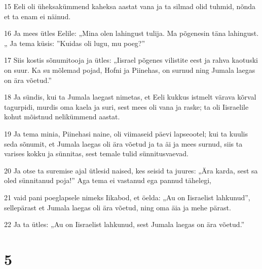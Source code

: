 \par 15 Eeli oli üheksakümmend kaheksa aastat vana ja ta silmad olid tuhmid, nõnda et ta enam ei näinud.
\par 16 Ja mees ütles Eelile: „Mina olen lahingust tulija. Ma põgenesin täna lahingust.„ Ja tema küsis: ”Kuidas oli lugu, mu poeg?”
\par 17 Siis kostis sõnumitooja ja ütles: „Iisrael põgenes vilistite eest ja rahva kaotuski on suur. Ka su mõlemad pojad, Hofni ja Piinehas, on surnud ning Jumala laegas on ära võetud.”
\par 18 Ja sündis, kui ta Jumala laegast nimetas, et Eeli kukkus istmelt värava kõrval tagurpidi, murdis oma kaela ja suri, sest mees oli vana ja raske; ta oli Iisraelile kohut mõistnud nelikümmend aastat.
\par 19 Ja tema minia, Piinehasi naine, oli viimaseid päevi lapseootel; kui ta kuulis seda sõnumit, et Jumala laegas oli ära võetud ja ta äi ja mees surnud, siis ta varises kokku ja sünnitas, sest temale tulid sünnitusvaevad.
\par 20 Ja otse ta suremise ajal ütlesid naised, kes seisid ta juures: „Ära karda, sest sa oled sünnitanud poja!” Aga tema ei vastanud ega pannud tähelegi,
\par 21 vaid pani poeglapsele nimeks Iikabod, et öelda: „Au on Iisraelist lahkunud”, sellepärast et Jumala laegas oli ära võetud, ning oma äia ja mehe pärast.
\par 22 Ja ta ütles: „Au on Iisraelist lahkunud, sest Jumala laegas on ära võetud.”

\chapter{5}

